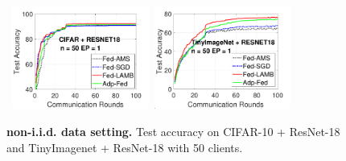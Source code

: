\documentclass[manuscript,screen,review]{acmart}
\begin{document}
\begin{figure}[t]
\vspace{-0.15in}
    \begin{center}
        \mbox{
\includegraphics[width=0.4\textwidth]{new_fmnist_mnist_fig/cifar_testerror_resnet18_ep1_client2_iid0_reddi.pdf}
        \hspace{-0.1in}\includegraphics[width=0.4\textwidth]{new_fmnist_mnist_fig/tinyimagenet_testerror_resnet18_ep1_client2_iid0_reddi.pdf}\hspace{-0.1in}
        }
    \end{center}
	\caption{\textbf{non-i.i.d. data setting.} Test accuracy on CIFAR-10 + ResNet-18 and TinyImagenet + ResNet-18 with 50 clients.
	}
	\label{fig:noniidresnet18}\vspace{-0.1in}
\end{figure}

\begin{table}[h]
\centering
\caption{Test Accuracy on ResNet-18 Network.}\label{tab:acc}
	\vspace{-0.2in}
\end{table}
\end{document}

